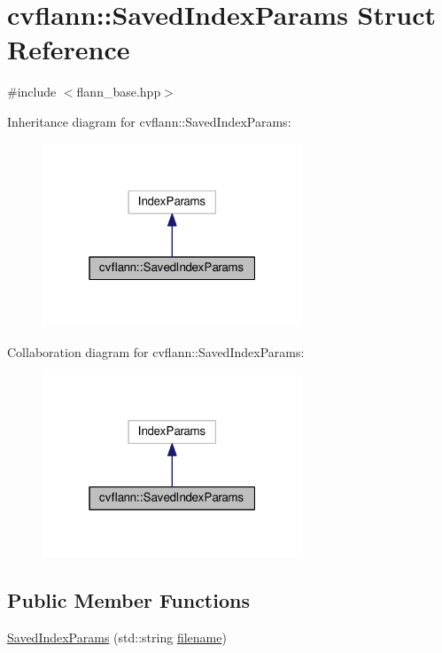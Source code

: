 \hypertarget{structcvflann_1_1SavedIndexParams}{\section{cvflann\-:\-:Saved\-Index\-Params Struct Reference}
\label{structcvflann_1_1SavedIndexParams}
}


{\ttfamily \#include $<$flann\-\_\-base.\-hpp$>$}



Inheritance diagram for cvflann\-:\-:Saved\-Index\-Params\-:\nopagebreak
\begin{figure}[H]
\begin{center}
\leavevmode
\includegraphics[width=220pt]{structcvflann_1_1SavedIndexParams__inherit__graph}
\end{center}
\end{figure}


Collaboration diagram for cvflann\-:\-:Saved\-Index\-Params\-:\nopagebreak
\begin{figure}[H]
\begin{center}
\leavevmode
\includegraphics[width=220pt]{structcvflann_1_1SavedIndexParams__coll__graph}
\end{center}
\end{figure}
\subsection*{Public Member Functions}
\begin{DoxyCompactItemize}
\item 
\hyperlink{structcvflann_1_1SavedIndexParams_a5bd2eb91b6a6150562b2575e79b247ed}{Saved\-Index\-Params} (std\-::string \hyperlink{core__c_8h_acc427f35f3bd9f865d39012657cc42f8}{filename})
\end{DoxyCompactItemize}


